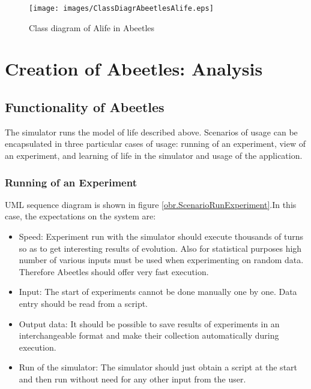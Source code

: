 \documentclass[a4paper,12pt]{report}
\begin{document}
\begin{figure}
\begin{center}
  \texttt{[image: images/ClassDiagrAbeetlesAlife.eps]}
  \caption{Class diagram of Alife in Abeetles}
  \label{img.ClassDiagrAbeetlesAlife}
\end{center}
\end{figure}


\chapter{Creation of Abeetles: Analysis}%


\section{Functionality of Abeetles}

The simulator runs the model of life described above. Scenarios of usage can be encapsulated in three particular cases of usage: running of an experiment, view of an experiment, and learning of life in the simulator and usage of the application.

\subsection {Running of an Experiment}
UML sequence diagram is shown in figure \ref{obr.ScenarioRunExperiment}.In this case, the expectations on the system are:
\begin{itemize}
\item Speed: Experiment run with the simulator should execute thousands of turns so as to get interesting results of evolution. Also for statistical purposes high number of various inputs must be used when experimenting on random data. Therefore Abeetles should offer very fast execution. 
\item Input: The start of experiments cannot be done manually one by one. Data entry should be read from a script. 
\item Output data: It should be possible to save results of experiments in an interchangeable format and make their collection automatically during execution.
\item Run of the simulator: The simulator should just obtain a script at the start and then run without need for any other input from the user. 

\end{itemize}
\end{document}
